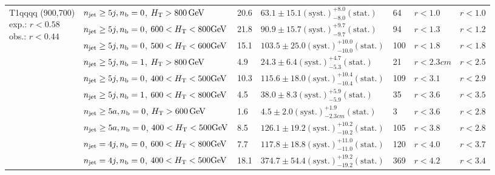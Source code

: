 \begin{table}[h!]
\begin{tabular}{ lllllll }
\multirow{10}{*}{\parbox[t]{2.3cm}{T1qqqq (900,700)\\exp.: $r<0.58$\\obs.: $r<0.44$}}
 & $n_{\mathrm{jet}} \geq5j,n_{\text{b}} =0$, $\mbox{$H_\text{T}$} > 800 \, \mathrm{GeV}$ & 20.6 & $63.1 \pm 15.1 \mathrm{(syst.)} ^{+8.0}_{-8.0} \mathrm{(stat.)}$ & 64 & $r < 1.0$ & $r < 1.0$\\ 
 & $n_{\mathrm{jet}} \geq5j,n_{\text{b}} =0$, $600 < \mbox{$H_\text{T}$} < 800 \mathrm{GeV}$ & 21.8 & $90.9 \pm 15.7 \mathrm{(syst.)} ^{+9.7}_{-9.7} \mathrm{(stat.)}$ & 94 & $r < 1.3$ & $r < 1.2$\\ 
 & $n_{\mathrm{jet}} \geq5j,n_{\text{b}} =0$, $500 < \mbox{$H_\text{T}$} < 600 \mathrm{GeV}$ & 15.1 & $103.5 \pm 25.0 \mathrm{(syst.)} ^{+10.0}_{-10.0} \mathrm{(stat.)}$ & 100 & $r < 1.8$ & $r < 1.8$\\ 
 & $n_{\mathrm{jet}} \geq5j,n_{\text{b}} =1$, $\mbox{$H_\text{T}$} > 800 \, \mathrm{GeV}$ & 4.9 & $24.3 \pm 6.4 \mathrm{(syst.)} ^{+4.7}_{-5.3} \mathrm{(stat.)}$ & 21 & $r < 2.3cm$ & $r < 2.5$\\ 
 & $n_{\mathrm{jet}} \geq5j,n_{\text{b}} =0$, $400 < \mbox{$H_\text{T}$} < 500 \mathrm{GeV}$ & 10.3 & $115.6 \pm 18.0 \mathrm{(syst.)} ^{+10.4}_{-10.4} \mathrm{(stat.)}$ & 109 & $r < 3.1$ & $r < 2.9$\\ 
 & $n_{\mathrm{jet}} \geq5j,n_{\text{b}} =1$, $600 < \mbox{$H_\text{T}$} < 800 \mathrm{GeV}$ & 4.5 & $38.0 \pm 8.3 \mathrm{(syst.)} ^{+5.9}_{-5.9} \mathrm{(stat.)}$ & 35 & $r < 3.6$ & $r < 3.5$\\ 
 & $n_{\mathrm{jet}} \geq5a,n_{\text{b}} =0$, $\mbox{$H_\text{T}$} > 600 \, \mathrm{GeV}$ & 1.6 & $4.5 \pm 2.0 \mathrm{(syst.)} ^{+1.9}_{-2.3cm} \mathrm{(stat.)}$ & 3 & $r < 3.6$ & $r < 2.8$\\ 
 & $n_{\mathrm{jet}} \geq5a,n_{\text{b}} =0$, $400 < \mbox{$H_\text{T}$} < 500 \mathrm{GeV}$ & 8.5 & $126.1 \pm 19.2 \mathrm{(syst.)} ^{+10.2}_{-10.2} \mathrm{(stat.)}$ & 105 & $r < 3.8$ & $r < 2.8$\\ 
 & $n_{\mathrm{jet}} =4j,n_{\text{b}} =0$, $600 < \mbox{$H_\text{T}$} < 800 \mathrm{GeV}$ & 7.7 & $117.8 \pm 18.8 \mathrm{(syst.)} ^{+11.0}_{-11.0} \mathrm{(stat.)}$ & 120 & $r < 4.0$ & $r < 3.7$\\ 
 & $n_{\mathrm{jet}} =4j,n_{\text{b}} =0$, $400 < \mbox{$H_\text{T}$} < 500 \mathrm{GeV}$ & 18.1 & $374.7 \pm 54.4 \mathrm{(syst.)} ^{+19.2}_{-19.2} \mathrm{(stat.)}$ & 369 & $r < 4.2$ & $r < 3.4$\\ \hline
    \hline
  \end{tabular}
\end{table}

